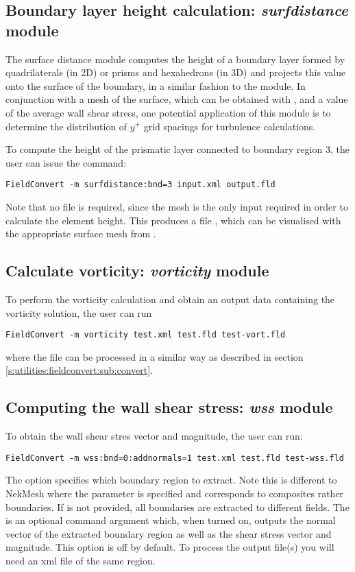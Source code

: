 %
%
%
\subsection{Boundary layer height calculation: \textit{surfdistance} module}

The surface distance module computes the height of a boundary layer formed by
quadrilaterals (in 2D) or prisms and hexahedrons (in 3D)
and projects this value onto the surface of the boundary, in a similar fashion
to the  module. In conjunction with a mesh of the surface, which
can be obtained with , and a value of the average wall shear
stress, one potential application of this module is to determine the
distribution of $y^+$ grid spacings for turbulence calculations.

To compute the height of the prismatic layer connected to boundary region 3, the
user can issue the command:
\begin{lstlisting}[style=BashInputStyle]
FieldConvert -m surfdistance:bnd=3 input.xml output.fld
\end{lstlisting}
Note that no  file is required, since the mesh is the only input
required in order to calculate the element height. This produces a file
, which can be visualised with the appropriate surface
mesh from .

%
%
%
\subsection{Calculate vorticity: \textit{vorticity} module}
To perform the vorticity calculation and obtain an output
data containing the vorticity solution, the user can run
\begin{lstlisting}[style=BashInputStyle]
FieldConvert -m vorticity test.xml test.fld test-vort.fld
\end{lstlisting}
where the file  can be processed in a similar
way as described in section \ref{s:utilities:fieldconvert:sub:convert}.
%
%
%

\subsection{Computing the wall shear stress: \textit{wss} module}
To obtain the wall shear stres vector and magnitude, the user can run:
\begin{lstlisting}[style=BashInputStyle]
FieldConvert -m wss:bnd=0:addnormals=1 test.xml test.fld test-wss.fld
\end{lstlisting}
The option  specifies which boundary region to extract. Note this is
different to NekMesh where the parameter  is specified and corresponds
to composites rather boundaries. If  is not provided, all boundaries
are extracted to different fields. The  is an optional command
argument which, when turned on, outputs the normal vector of the extracted boundary
region as well as the shear stress vector and magnitude. This option is off by default.
To process the output file(s) you will need an xml file of the same region.
%
%
%

